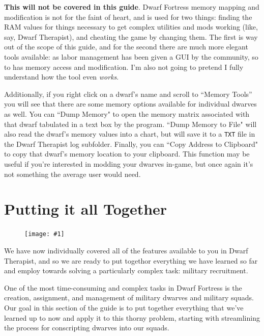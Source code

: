 \documentclass[]{article}
\newcommand{\fullfigure}[1] {
\begin{figure}[h!]
\texttt{[image: \#1]}
\end{figure}
}
\begin{document}
{\begin{flushleft}
\textbf{This will not be covered in this guide}. Dwarf Fortress memory mapping and modification is not
for the faint of heart, and is used for two things: finding the RAM values for things necessary to get
complex utilities and mods working (like, say, Dwarf Therapist), and cheating the game by changing them.
The first is way out of the scope of this guide, and for the second there are much more elegant tools
available: as labor management has been given a GUI by the community, so to has memory access and
modification. I'm also not going to pretend I fully understand how the tool even \emph{works}.

Additionally, if you right click on a dwarf's name and scroll to ``Memory Tools'' you will see that there
are some memory options available for individual dwarves as well. You can ``Dump Memory" to open the
memory matrix associated with that dwarf tabulated in a text box by the program. ``Dump Memory to File"
will also read the dwarf's memory values into a chart, but will save it to a \texttt{TXT} file in the
Dwarf Therapist log subfolder. Finally, you can ``Copy Address to Clipboard" to copy that dwarf's memory
location to your clipboard. This function may be useful if you're interested in modding your dwarves
in-game, but once again it's not something the average user would need.
\end{flushleft}
}

\newpage

\section{Putting it all Together}
\label{sec:Putting it all Together}

\fullfigure{Sec5Fig1}

We have now individually covered all of the features available to you in Dwarf Therapist, and so we are
ready to put togethor everything we have learned so far and employ towards solving a particularly
complex task: military recruitment.

One of the most time-consuming and complex tasks in Dwarf Fortress is the creation, assignment, and
management of military dwarves and military squads. Our goal in this section of the guide is to put
together everything that we've learned up to now and apply it to this thorny problem, starting with
streamlining the process for conscripting dwarves into our squads.
\end{document}
